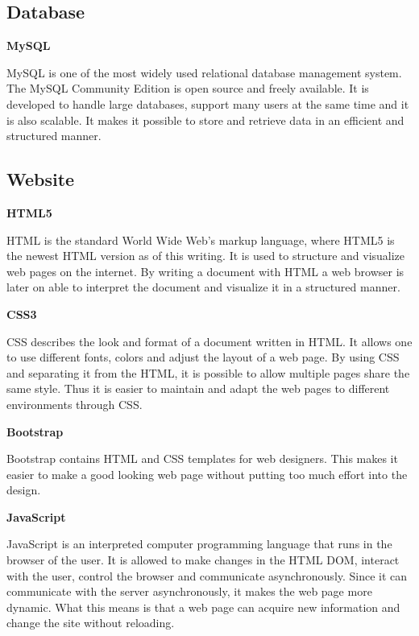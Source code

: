 \subsection{Database}

\textbf{MySQL} \nocite{MySQL}

MySQL is one of the most widely used relational database management system.
The MySQL Community Edition is open source and freely available.
It is developed to handle large databases, support many users at the same time and it is also scalable.
It makes it possible to store and retrieve data in an efficient and structured manner.

\subsection{Website}

\textbf{HTML5} \nocite{HTML5}

HTML is the standard World Wide Web's markup language, where HTML5 is the newest HTML version as of this writing.
It is used to structure and visualize web pages on the internet.
By writing a document with HTML a web browser is later on able to interpret the document and visualize it in a structured manner.

\textbf{CSS3} \nocite{CSS3}

CSS describes the look and format of a document written in HTML.
It allows one to use different fonts, colors and adjust the layout of a web page.
By using CSS and separating it from the HTML, it is possible to allow multiple pages share the same style.
Thus it is easier to maintain and adapt the web pages to different environments through CSS.

\textbf{Bootstrap} \nocite{Bootstrap}

Bootstrap contains HTML and CSS templates for web designers.
This makes it easier to make a good looking web page without putting too much effort into the design.

\textbf{JavaScript} \nocite{JavaScript}

JavaScript is an interpreted computer programming language that runs in the browser of the user.
It is allowed to make changes in the HTML DOM, interact with the user, control the browser and communicate asynchronously.
Since it can communicate with the server asynchronously, it makes the web page more dynamic.
What this means is that a web page can acquire new information and change the site without reloading.

